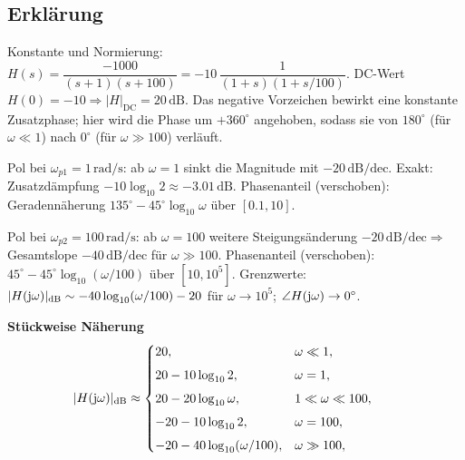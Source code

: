 \begin{center}
\end{center}
\newpage
\subsection{Erklärung}
\vspace{5mm}
\begin{description}[leftmargin=1.2em,labelsep=.6em,font=\bfseries]
\item[Schritt 1] Konstante und Normierung: 
\(H(s)=\dfrac{-1000}{(s+1)(s+100)}=-10\,\dfrac{1}{(1+s)(1+s/100)}\).
DC-Wert \(H(0)=-10\Rightarrow |H|_{\mathrm{DC}}=20\,\mathrm{dB}\). Das negative Vorzeichen bewirkt eine konstante Zusatzphase; hier wird die Phase um \(+360^\circ\) angehoben, sodass sie von \(180^\circ\) (für \(\omega\ll1\)) nach \(0^\circ\) (für \(\omega\gg100\)) verläuft.
\item[Schritt 2] Pol bei \(\omega_{p1}=1\,\mathrm{rad/s}\): ab \(\omega=1\) sinkt die Magnitude mit \(-20\,\mathrm{dB/dec}\). Exakt: Zusatzdämpfung \(-10\log_{10}2\approx-3.01\,\mathrm{dB}\). Phasenanteil (verschoben): Geradennäherung \(135^\circ-45^\circ\log_{10}\omega\) über \([0.1,10]\).
\item[Schritt 3] Pol bei \(\omega_{p2}=100\,\mathrm{rad/s}\): ab \(\omega=100\) weitere Steigungsänderung \(-20\,\mathrm{dB/dec}\)\(\Rightarrow\) Gesamtslope \(-40\,\mathrm{dB/dec}\) für \(\omega\gg100\). Phasenanteil (verschoben): \(45^\circ-45^\circ\log_{10}(\omega/100)\) über \([10,10^5]\). Grenzwerte: \(|H(\operatorname{j}\!\omega)|_{\mathrm{dB}}\sim -40\log_{10}(\omega/100)-20\) für \(\omega\to10^5\); \(\angle H(\operatorname{j}\!\omega)\to 0^\circ\).
\end{description}

\vspace{0.5cm}
\medskip
\noindent\textbf{Stückweise Näherung}
\[
|H(\operatorname{j}\!\omega)|_{\mathrm{dB}}\approx
\begin{cases}
20,& \omega\ll1,\\[4pt]
20-10\log_{10}2,& \omega=1,\\[4pt]
20-20\log_{10}\omega,& 1\ll\omega\ll100,\\[4pt]
-20-10\log_{10}2,& \omega=100,\\[4pt]
-20-40\log_{10}(\omega/100),& \omega\gg100,
\end{cases}
\qquad
\]
\newpage